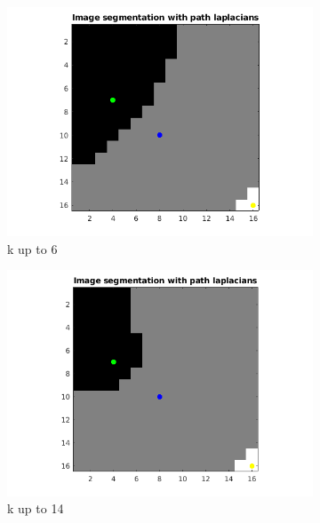 \documentclass[10pt,a4paper]{article}
\begin{document}
\begin{figure}[H]
\begin{subfigure}[b]{0.45\textwidth}
		\includegraphics[width=\textwidth]{segmentation-images/16by16longrange6-s2.png}
		\caption{k up to 6}
	\end{subfigure}
	\begin{subfigure}[b]{0.45\textwidth}
		\includegraphics[width=\textwidth]{segmentation-images/16by16longrange14-s2.png}
		\caption{k up to 14}
	\end{subfigure}\\
	\begin{subfigure}[b]{0.45\textwidth}

\end{subfigure}
\end{figure}
\end{document}
